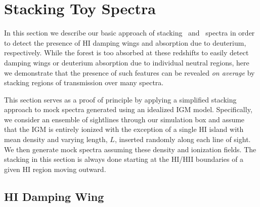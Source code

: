 \section{Stacking Toy Spectra} \label{sec:NeutralIslandsStacking}


In this section we describe our basic approach of stacking \lya\ and \lyb\ spectra in order to detect the presence of HI damping wings and absorption due to deuterium, respectively. While the forest is too absorbed at these redshifts to easily detect damping wings or deuterium absorption due to individual neutral regions, here we demonstrate that the presence of such features can be revealed \textit{on average} by stacking regions of transmission over many spectra.
 
 
This section serves as a proof of principle by applying a simplified stacking approach to mock spectra generated using an idealized IGM model. Specifically, we consider an ensemble of sightlines through our simulation box and assume that the IGM is entirely ionized with the exception of a single HI island with mean density and varying length, $L$, inserted randomly along each line of sight. We then generate mock spectra assuming these density and ionization fields. The stacking in this section is always done starting at the HI/HII boundaries of a given HI region moving outward.




\subsection{HI Damping Wing} \label{sec:NeutralIslandsToyHI}



